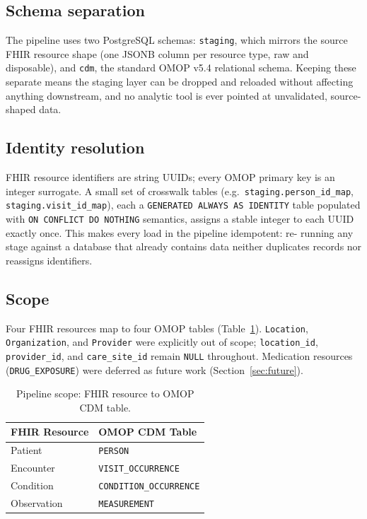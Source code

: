 \documentclass[11pt]{article}
\begin{document}
\subsection{Schema separation}

The pipeline uses two PostgreSQL schemas: \texttt{staging}, which mirrors
the source FHIR resource shape (one JSONB column per resource type, raw and
disposable), and \texttt{cdm}, the standard OMOP v5.4 relational schema.
Keeping these separate means the staging layer can be dropped and reloaded
without affecting anything downstream, and no analytic tool is ever pointed
at unvalidated, source-shaped data.

\subsection{Identity resolution}

FHIR resource identifiers are string UUIDs; every OMOP primary key is an
integer surrogate. A small set of crosswalk tables (e.g.\
\texttt{staging.person\_id\_map}, \texttt{staging.visit\_id\_map}), each a
\texttt{GENERATED ALWAYS AS IDENTITY} table populated with
\texttt{ON CONFLICT DO NOTHING} semantics, assigns a stable integer to each
UUID exactly once. This makes every load in the pipeline idempotent: re-
running any stage against a database that already contains data neither
duplicates records nor reassigns identifiers.

\subsection{Scope}

Four FHIR resources map to four OMOP tables (Table~\ref{tab:scope}).
\texttt{Location}, \texttt{Organization}, and \texttt{Provider} were
explicitly out of scope; \texttt{location\_id}, \texttt{provider\_id}, and
\texttt{care\_site\_id} remain \texttt{NULL} throughout. Medication
resources (\texttt{DRUG\_EXPOSURE}) were deferred as future work
(Section~\ref{sec:future}).

\begin{table}[h]
\centering
\caption{Pipeline scope: FHIR resource to OMOP CDM table.}
\label{tab:scope}
\begin{tabular}{ll}
\toprule
FHIR Resource & OMOP CDM Table \\
\midrule
Patient & \texttt{PERSON} \\
Encounter & \texttt{VISIT\_OCCURRENCE} \\
Condition & \texttt{CONDITION\_OCCURRENCE} \\
Observation & \texttt{MEASUREMENT} \\
\bottomrule
\end{tabular}
\end{table}
\end{document}
